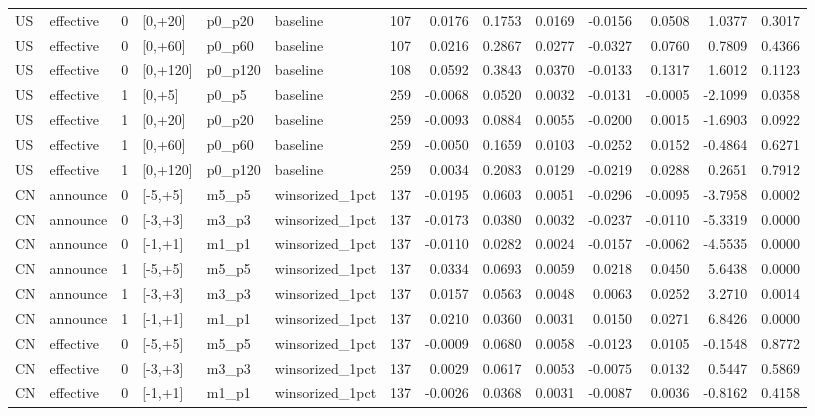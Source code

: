 \begin{tabular}{llrlllrrrrrrrr}
US & effective & 0 & [0,+20] & p0_p20 & baseline & 107 & 0.0176 & 0.1753 & 0.0169 & -0.0156 & 0.0508 & 1.0377 & 0.3017 \\
US & effective & 0 & [0,+60] & p0_p60 & baseline & 107 & 0.0216 & 0.2867 & 0.0277 & -0.0327 & 0.0760 & 0.7809 & 0.4366 \\
US & effective & 0 & [0,+120] & p0_p120 & baseline & 108 & 0.0592 & 0.3843 & 0.0370 & -0.0133 & 0.1317 & 1.6012 & 0.1123 \\
US & effective & 1 & [0,+5] & p0_p5 & baseline & 259 & -0.0068 & 0.0520 & 0.0032 & -0.0131 & -0.0005 & -2.1099 & 0.0358 \\
US & effective & 1 & [0,+20] & p0_p20 & baseline & 259 & -0.0093 & 0.0884 & 0.0055 & -0.0200 & 0.0015 & -1.6903 & 0.0922 \\
US & effective & 1 & [0,+60] & p0_p60 & baseline & 259 & -0.0050 & 0.1659 & 0.0103 & -0.0252 & 0.0152 & -0.4864 & 0.6271 \\
US & effective & 1 & [0,+120] & p0_p120 & baseline & 259 & 0.0034 & 0.2083 & 0.0129 & -0.0219 & 0.0288 & 0.2651 & 0.7912 \\
CN & announce & 0 & [-5,+5] & m5_p5 & winsorized_1pct & 137 & -0.0195 & 0.0603 & 0.0051 & -0.0296 & -0.0095 & -3.7958 & 0.0002 \\
CN & announce & 0 & [-3,+3] & m3_p3 & winsorized_1pct & 137 & -0.0173 & 0.0380 & 0.0032 & -0.0237 & -0.0110 & -5.3319 & 0.0000 \\
CN & announce & 0 & [-1,+1] & m1_p1 & winsorized_1pct & 137 & -0.0110 & 0.0282 & 0.0024 & -0.0157 & -0.0062 & -4.5535 & 0.0000 \\
CN & announce & 1 & [-5,+5] & m5_p5 & winsorized_1pct & 137 & 0.0334 & 0.0693 & 0.0059 & 0.0218 & 0.0450 & 5.6438 & 0.0000 \\
CN & announce & 1 & [-3,+3] & m3_p3 & winsorized_1pct & 137 & 0.0157 & 0.0563 & 0.0048 & 0.0063 & 0.0252 & 3.2710 & 0.0014 \\
CN & announce & 1 & [-1,+1] & m1_p1 & winsorized_1pct & 137 & 0.0210 & 0.0360 & 0.0031 & 0.0150 & 0.0271 & 6.8426 & 0.0000 \\
CN & effective & 0 & [-5,+5] & m5_p5 & winsorized_1pct & 137 & -0.0009 & 0.0680 & 0.0058 & -0.0123 & 0.0105 & -0.1548 & 0.8772 \\
CN & effective & 0 & [-3,+3] & m3_p3 & winsorized_1pct & 137 & 0.0029 & 0.0617 & 0.0053 & -0.0075 & 0.0132 & 0.5447 & 0.5869 \\
CN & effective & 0 & [-1,+1] & m1_p1 & winsorized_1pct & 137 & -0.0026 & 0.0368 & 0.0031 & -0.0087 & 0.0036 & -0.8162 & 0.4158 \\

\end{tabular}
